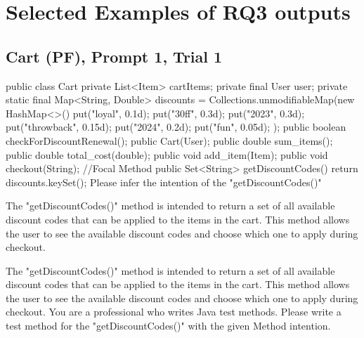 \section{Selected Examples of RQ3 outputs}

\subsection{Cart (PF), Prompt 1, Trial 1}

\begin{prompt}
  public class Cart {
    private List<Item> cartItems;
    private final User user;
    private static final Map<String, Double> discounts = Collections.unmodifiableMap(new HashMap<>() {{
        put("loyal", 0.1d);
        put("30ff", 0.3d); put("2023", 0.3d);
        put("throwback", 0.15d); put("2024", 0.2d);
        put("fun", 0.05d);
    }});
    public boolean checkForDiscountRenewal();
    public Cart(User);
    public double sum_items();
    public double total_cost(double);
    public void add_item(Item);
    public void checkout(String);
    //Focal Method
    public Set<String> getDiscountCodes() {
        return discounts.keySet();
    }
}
Please infer the intention of the "getDiscountCodes()"
\end{prompt}

\begin{answer}
The "getDiscountCodes()" method is intended to return a set of all available discount codes that can be applied to the items in the cart. This method allows the user to see the available discount codes and choose which one to apply during checkout.
\end{answer}

\begin{prompt}
The "getDiscountCodes()" method is intended to return a set of all available discount codes that can be applied to the items in the cart. This method allows the user to see the available discount codes and choose which one to apply during checkout.
You are a professional who writes Java test methods. Please write a test method for the "getDiscountCodes()" with the given Method intention.  
\end{prompt}

